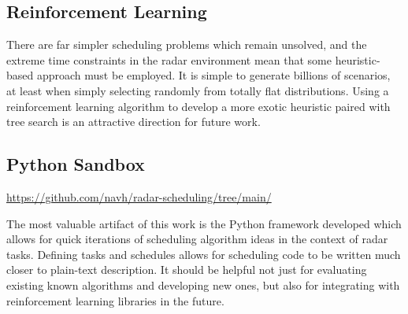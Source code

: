 \documentclass[conference]{IEEEtran}
\begin{document}
\subsection{Reinforcement Learning}

There are far simpler scheduling problems which remain unsolved, and the extreme time constraints in the radar environment mean that some heuristic-based approach must be employed.
It is simple to generate billions of scenarios, at least when simply selecting randomly from totally flat distributions.
Using a reinforcement learning algorithm to develop a more exotic heuristic paired with tree search is an attractive direction for future work.

\subsection{Python Sandbox}

\href{https://github.com/navh/radar-scheduling/tree/main/}{https://github.com/navh/radar-scheduling/tree/main/}

The most valuable artifact of this work is the Python framework developed which allows for quick iterations of scheduling algorithm ideas in the context of radar tasks.
Defining tasks and schedules allows for scheduling code to be written much closer to plain-text description.
It should be helpful not just for evaluating existing known algorithms and developing new ones, but also for integrating with reinforcement learning libraries in the future.





\end{document}
